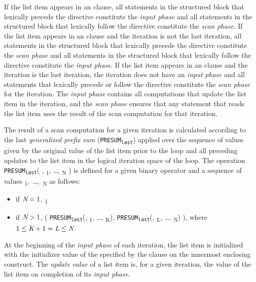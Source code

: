 If the list item appears in an  clause, all statements in the
structured block that lexically precede the directive constitute the
\textit{input phase} and all statements in the structured block that lexically follow the
directive constitute the \textit{scan phase}. If the list item appears in an
 clause and the iteration is not the last iteration, all
statements in the structured block that lexically precede the directive
constitute the \textit{scan phase} and all statements in the structured block that
lexically follow the directive constitute the \textit{input phase}. If the list item
appears in an  clause and the iteration is the last iteration,
the iteration does not have an \textit{input phase} and all statements that lexically
precede or follow the directive constitute the \textit{scan phase} for the iteration.
The \textit{input phase} contains all computations that update the list item in the
iteration, and the \textit{scan phase} ensures that any statement that reads the list
item uses the result of the scan computation for that iteration.

The result of a scan computation for a given iteration is calculated according
to the last \textit{generalized prefix sum}
(\texttt{PRESUM\textsubscript{last}}) applied over the sequence of values
given by the original value of the list item prior to the loop and all
preceding updates to the list
item in the logical iteration space of the loop. The operation
\texttt{PRESUM\textsubscript{last}}(
, \textsubscript{1}, \ldots, \textsubscript{N} ) is
defined for a given binary operator  and a sequence of  values
\mbox{\textsubscript{1}, \ldots, \textsubscript{N}} as follows:

\begin{itemize}

\item if $\plc{N} = 1$, \textsubscript{1}

\item if $\plc{N} > 1$, (
    \texttt{PRESUM\textsubscript{last}}(, \textsubscript{1},
    \ldots, \textsubscript{K}), \texttt{PRESUM\textsubscript{last}}(, \textsubscript{L}, \ldots, \textsubscript{N}) ), where $1 \leq \plc{K}+1 = \plc{L} \leq \plc{N}$.
\end{itemize}

At the beginning of the \textit{input phase} of each iteration, the list item is
initialized with the initializer value of the 
specified by the  clause on the innermost enclosing construct.
The \textit{update value} of a list item is, for a given iteration, the value
of the list item on completion of its \textit{input phase}.

